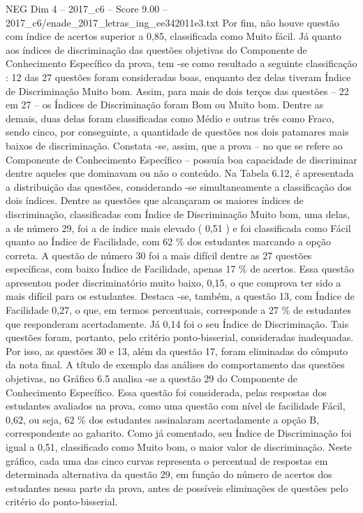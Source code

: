 \begin{textsample}{NEG Dim 4 – 2017\_c6 – Score 9.00 – 2017\_c6/enade\_2017\_letras\_ing\_ee342011e3.txt}
Por fim, não houve questão com índice de acertos superior a 0,85, classificada como Muito fácil.
Já quanto aos índices de discriminação das questões objetivas do Componente de Conhecimento Específico da prova, tem -se como resultado a seguinte classificação : 12 das 27 questões foram consideradas boas, enquanto dez delas tiveram Índice de Discriminação Muito bom.
Assim, para mais de dois terços das questões – 22 em 27 – os Índices de Discriminação foram Bom ou Muito bom.
Dentre as demais, duas delas foram classificadas como Médio e outras três como Fraco, sendo cinco, por conseguinte, a quantidade de questões nos dois patamares mais baixos de discriminação.
Constata -se, assim, que a prova – no que se refere ao Componente de Conhecimento Específico – possuía boa capacidade de discriminar dentre aqueles que dominavam ou não o conteúdo.
Na Tabela 6.12, é apresentada a distribuição das questões, considerando -se simultaneamente a classificação dos dois índices.
Dentre as questões que alcançaram os maiores índices de discriminação, classificadas com Índice de Discriminação Muito bom, uma delas, a de número 29, foi a de índice mais elevado ( 0,51 ) e foi classificada como Fácil quanto ao Índice de Facilidade, com 62 \% dos estudantes marcando a opção correta.
A questão de número 30 foi a mais difícil dentre as 27 questões específicas, com baixo Índice de Facilidade, apenas 17 \% de acertos.
Essa questão apresentou poder discriminatório muito baixo, 0,15, o que comprova ter sido a mais difícil para os estudantes.
Destaca -se, também, a questão 13, com Índice de Facilidade 0,27, o que, em termos percentuais, corresponde a 27 \% de estudantes que responderam acertadamente.
Já 0,14 foi o seu Índice de Discriminação.
Tais questões foram, portanto, pelo critério ponto-bisserial, consideradas inadequadas.
Por isso, as questões 30 e 13, além da questão 17, foram eliminadas do cômputo da nota final.
A título de exemplo das análises do comportamento das questões objetivas, no Gráfico 6.5 analisa -se a questão 29 do Componente de Conhecimento Específico.
Essa questão foi considerada, pelas respostas dos estudantes avaliados na prova, como uma questão com nível de facilidade Fácil, 0,62, ou seja, 62 \% dos estudantes assinalaram acertadamente a opção B, correspondente ao gabarito.
Como já comentado, seu Índice de Discriminação foi igual a 0,51, classificado como Muito bom, o maior valor de discriminação.
Neste gráfico, cada uma das cinco curvas representa o percentual de respostas em determinada alternativa da questão 29, em função do número de acertos dos estudantes nessa parte da prova, antes de possíveis eliminações de questões pelo critério do ponto-bisserial.

\end{textsample}
